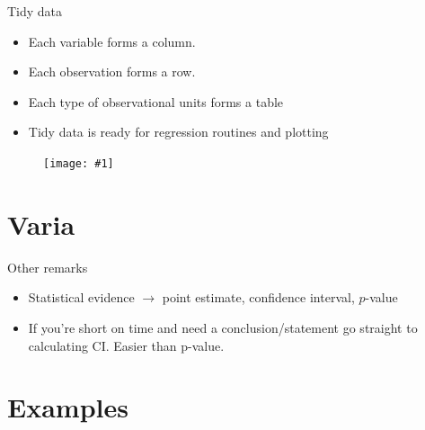 \documentclass{beamer}\usepackage[]{graphicx}\usepackage[]{color}
\newcommand {\framedgraphic}[1] {
	\begin{figure}
		\centering
		\texttt{[image: \#1]}
	\end{figure}
}
\begin{document}
\begin{frame}{Tidy data}

\begin{itemize}
	\setlength\itemsep{.51em}
	\item Each variable forms a column.
	\item Each observation forms a row.
	\item Each type of observational units forms a table
	\item Tidy data is ready for regression routines and plotting
\end{itemize}


\framedgraphic{tidy.png}

\end{frame}



\section{Varia}

\begin{frame}{Other remarks}

\begin{itemize}
	\setlength\itemsep{.51em}
	\item Statistical evidence $\to$ point estimate, confidence interval, $p$-value
	\item If you're short on time and need a conclusion/statement go straight to calculating CI. Easier than p-value. 
\end{itemize}




\end{frame}


























\section{Examples}
\end{document}
